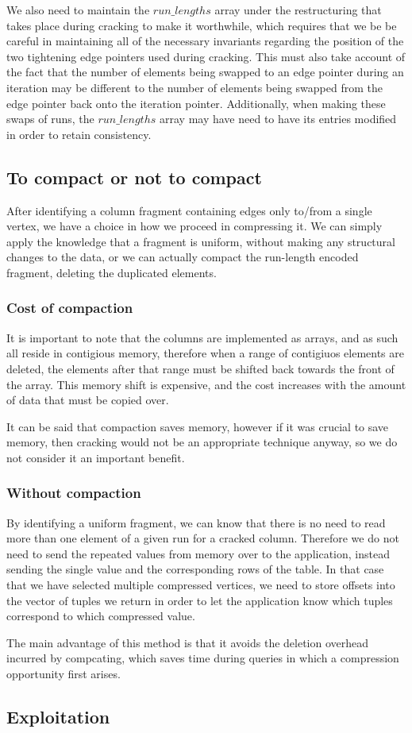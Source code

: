 We also need to maintain the $run\_lengths$ array under the restructuring that takes place during
cracking to make it worthwhile, which requires that we be be careful in maintaining all of the
necessary invariants regarding the position of the two tightening edge pointers used during cracking.
This must also take account of the fact that the number of elements being swapped to an edge
pointer during an iteration may be different to the number of elements being swapped from the edge
pointer back onto the iteration pointer. Additionally, when making these swaps of runs, the
$run\_lengths$ array may have need to have its entries modified in order to retain consistency.


\subsection{To compact or not to compact}

After identifying a column fragment containing edges only to/from a single vertex, we have a choice 
in how we proceed in compressing it. We can simply apply the knowledge that a fragment is uniform,
without making any structural changes to the data, or we can actually compact the run-length
encoded fragment, deleting the duplicated elements.

\subsubsection{Cost of compaction}

It is important to note that the columns are implemented as arrays, and as such all reside in
contigious memory, therefore when a range of contigiuos elements are deleted, the elements after
that range must be shifted back towards the front of the array. This memory shift is expensive,
and the cost increases with the amount of data that must be copied over.

It can be said that compaction saves memory, however if it was crucial to save memory, then cracking
would not be an appropriate technique anyway, so we do not consider it an important benefit.

\subsubsection{Without compaction}

By identifying a uniform fragment, we can know that there is no need to read more than one element
of a given run for a cracked column. Therefore we do not need to send the repeated values from
memory over to the application, instead sending the single value and the corresponding rows of the
table. In that case that we have selected multiple compressed vertices, we need to store offsets
into the vector of tuples we return in order to let the application know which tuples correspond to
which compressed value.

The main advantage of this method is that it avoids the deletion overhead incurred by compcating,
which saves time during queries in which a compression opportunity first arises.

\subsection{Exploitation}
\label{ss:compressionexploitation}
